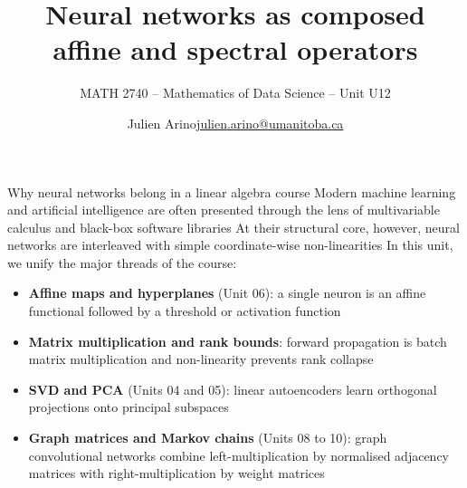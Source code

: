 \documentclass[aspectratio=169]{beamer}\usepackage[]{graphicx}\usepackage[]{xcolor}
\subtitle{MATH 2740 -- Mathematics of Data Science -- Unit U12}
\author{\texorpdfstring{Julien Arino\newline\url{julien.arino@umanitoba.ca}}{Julien Arino}}
\institute{Department of Mathematics @ University of Manitoba}
\title{Neural networks as composed affine and spectral operators}
\begin{document}
\setcounter{theorem}{179}

\SStitlepage
\SSoutlinepage


\begin{frame}{Why neural networks belong in a linear algebra course}
Modern machine learning and artificial intelligence are often presented through the lens of multivariable calculus and black-box software libraries
\vfill
At their structural core, however, neural networks are  interleaved with simple coordinate-wise non-linearities
\vfill
In this unit, we unify the major threads of the course:
\begin{itemize}
\item \textbf{Affine maps and hyperplanes} (Unit 06): a single neuron is an affine functional followed by a threshold or activation function
\item \textbf{Matrix multiplication and rank bounds}: forward propagation is batch matrix multiplication and non-linearity prevents rank collapse
\item \textbf{SVD and PCA} (Units 04 and 05): linear autoencoders learn orthogonal projections onto principal subspaces
\item \textbf{Graph matrices and Markov chains} (Units 08 to 10): graph convolutional networks combine left-multiplication by normalised adjacency matrices with right-multiplication by weight matrices
\end{itemize}
\end{frame}



\end{document}

